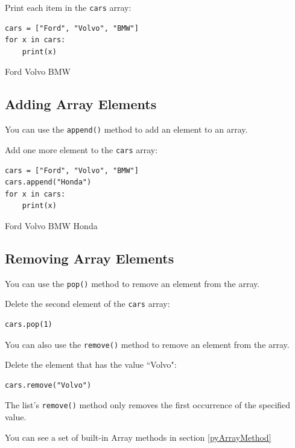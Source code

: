 \documentclass[12pt,a4paper]{article}
\newcommand{\code}[1]{%
	\colorbox{backcolour}{\lstinline{#1}}%
}
\newcommand{\lcode}[1]{%
	\lstinline{#1}%
}
\begin{document}
\begin{ebox}
Print each item in the \lcode{cars} array:
	\begin{lstlisting}
cars = ["Ford", "Volvo", "BMW"]
for x in cars:
    print(x)
	\end{lstlisting}
\tcblower
	\begin{vercode}
Ford
Volvo
BMW
	\end{vercode}
\end{ebox}
\subsection{Adding Array Elements}

You can use the \code{append()} method to add an element to an array.

\begin{ebox}
Add one more element to the \lcode{cars} array:
	\begin{lstlisting}
cars = ["Ford", "Volvo", "BMW"]
cars.append("Honda")
for x in cars:
    print(x)
	\end{lstlisting}
\tcblower
	\begin{vercode}
Ford
Volvo
BMW
Honda
	\end{vercode}
\end{ebox}
\subsection{Removing Array Elements}

You can use the \code{pop()} method to remove an element from the array.

\begin{ebox}
Delete the second element of the \lcode{cars} array:
	\begin{lstlisting}
cars.pop(1)
	\end{lstlisting}
\end{ebox}

You can also use the \code{remove()} method to remove an element from the
array.

\begin{ebox}
Delete the element that has the value ``Volvo":
	\begin{lstlisting}
cars.remove("Volvo")
	\end{lstlisting}
\end{ebox}

\begin{nbox}
The list's \lcode{remove()} method only removes the first occurrence of the specified value.
\end{nbox}
You can see a set of built-in Array methods in section \ref{pyArrayMethod}
\vfill\newpage
\end{document}
